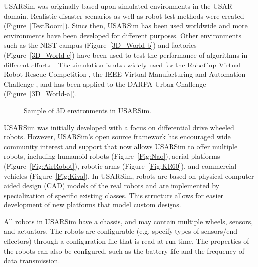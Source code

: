 USARSim was originally based upon simulated environments in the USAR domain. Realistic disaster scenarios as well as robot test methods were created (Figure~\ref{TestRoom}).
Since then, USARSim has been used worldwide and more environments have been developed for different purposes. Other environments such as the NIST campus (Figure~\ref{3D_World-b}) and factories (Figure~\ref{3D_World-c}) have been used to test the performance of algorithms in different efforts~\cite{WANG.HFES.2005,BALAGUER.IROS.2008,KOOTBALLY.ITEA.2010}. The simulation is also widely used for the RoboCup Virtual Robot Rescue Competition \cite{RoboCupWeb}, the IEEE Virtual Manufacturing and Automation Challenge \cite{VMACWeb}, and has been applied to the DARPA Urban Challenge (Figure~\ref{3D_World-a}).

\begin{figure}[t!]
\centering
{}\qquad
{}\qquad
{}\qquad%
\caption{Sample of 3D environments in USARSim.} \label{3D_World}
\end{figure}

USARSim was initially developed with a focus on differential drive wheeled robots. However, USARSim's open source framework has encouraged wide community interest and support that now allows USARSim to offer multiple robots, including humanoid robots (Figure~\ref{Fig:Nao}), aerial platforms (Figure~\ref{Fig:AirRobot}), robotic arms (Figure~\ref{Fig:KR60}), and commercial vehicles (Figure~\ref{Fig:Kiva}). In USARSim, robots are based on physical computer aided design (CAD) models of the real
robots and are implemented by specialization of specific existing classes. This structure allows for easier development of new platforms that model custom designs.

All robots in USARSim have a chassis, and may contain multiple wheels, sensors, and
actuators. The robots are configurable (e.g. specify types of
sensors/end effectors) through a configuration file that is read at run-time. The properties of the robots can
also be configured, such as the battery life and the frequency of
data transmission.

